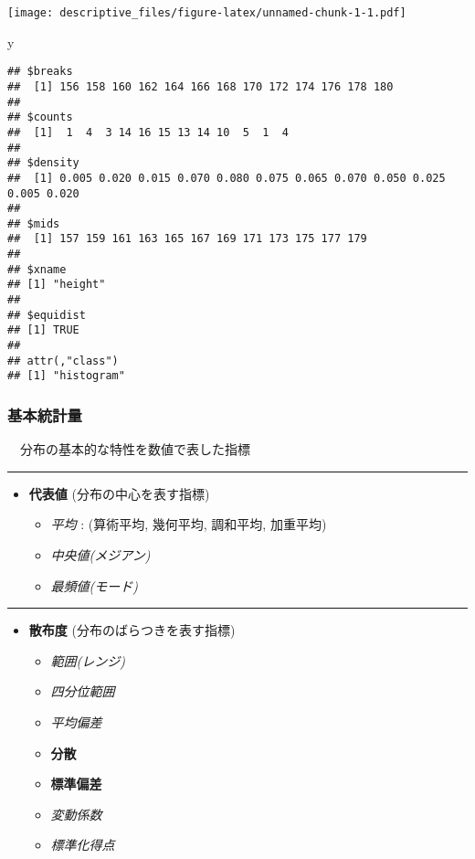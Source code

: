 \documentclass[
]{article}
\newenvironment{Shaded}{\begin{snugshade}}{\end{snugshade}}
\newcommand{\NormalTok}[1]{#1}
\providecommand{\tightlist}{%
  \setlength{\itemsep}{0pt}\setlength{\parskip}{0pt}}
\begin{document}
\texttt{[image: descriptive\_files/figure-latex/unnamed-chunk-1-1.pdf]}

\begin{Shaded}
\begin{Highlighting}[]
\NormalTok{y}
\end{Highlighting}
\end{Shaded}

\begin{verbatim}
## $breaks
##  [1] 156 158 160 162 164 166 168 170 172 174 176 178 180
## 
## $counts
##  [1]  1  4  3 14 16 15 13 14 10  5  1  4
## 
## $density
##  [1] 0.005 0.020 0.015 0.070 0.080 0.075 0.065 0.070 0.050 0.025 0.005 0.020
## 
## $mids
##  [1] 157 159 161 163 165 167 169 171 173 175 177 179
## 
## $xname
## [1] "height"
## 
## $equidist
## [1] TRUE
## 
## attr(,"class")
## [1] "histogram"
\end{verbatim}

\hypertarget{ux57faux672cux7d71ux8a08ux91cf}{%
\subsubsection{基本統計量}\label{ux57faux672cux7d71ux8a08ux91cf}}

　分布の基本的な特性を数値で表した指標

\begin{center}\rule{0.5\linewidth}{0.5pt}\end{center}

\begin{itemize}
\tightlist
\item
  \textbf{代表値} (分布の中心を表す指標)

  \begin{itemize}
  \tightlist
  \item
    \emph{平均} : (算術平均, 幾何平均, 調和平均, 加重平均)
  \item
    \emph{中央値(メジアン)}
  \item
    \emph{最頻値(モード)}
  \end{itemize}
\end{itemize}

\begin{center}\rule{0.5\linewidth}{0.5pt}\end{center}

\begin{itemize}
\tightlist
\item
  \textbf{散布度} (分布のばらつきを表す指標)

  \begin{itemize}
  \tightlist
  \item
    \emph{範囲(レンジ)}
  \item
    \emph{四分位範囲}
  \item
    \emph{平均偏差}
  \item
    \textbf{分散}
  \item
    \textbf{標準偏差}
  \item
    \emph{変動係数}
  \item
    \emph{標準化得点}
  \end{itemize}
\end{itemize}
\end{document}
